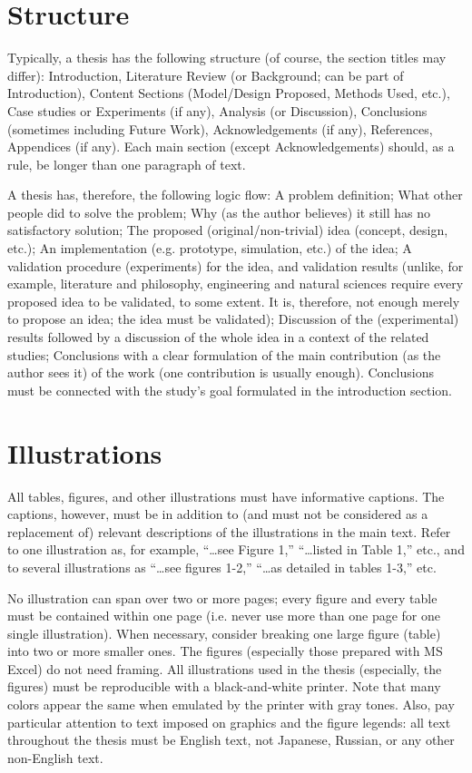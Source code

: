 \documentclass[12pt]{report}
\begin{document}
\section{Structure}
Typically, a thesis has the following structure (of course, the section titles may differ): Introduction, Literature Review (or Background; can be part of Introduction), Content Sections (Model/Design Proposed, Methods Used, etc.), Case studies or Experiments (if any), Analysis (or Discussion), Conclusions (sometimes including Future Work), Acknowledgements (if any), References, Appendices (if any). Each main section (except Acknowledgements) should, as a rule, be longer than one paragraph of text.

A thesis has, therefore, the following logic flow: A problem definition; What other people did to solve the problem; Why (as the author believes) it still has no satisfactory solution; The proposed (original/non-trivial) idea (concept, design, etc.); An implementation (e.g. prototype, simulation, etc.) of the idea; A validation procedure (experiments) for the idea, and validation results (unlike, for example, literature and philosophy, engineering and natural sciences require every proposed idea to be validated, to some extent. It is, therefore, not enough merely to propose an idea; the idea must be validated); Discussion of the (experimental) results followed by a discussion of the whole idea in a context of the related studies; Conclusions with a clear formulation of the main contribution (as the author sees it) of the work (one contribution is usually enough). Conclusions must be connected with the study’s goal formulated in the introduction section.

\section{Illustrations}
All tables, figures, and other illustrations must have informative captions. The captions, however, must be in addition to (and must not be considered as a replacement of) relevant descriptions of the illustrations in the main text. Refer to one illustration as, for example, “…see Figure 1,” “…listed in Table 1,” etc., and to several illustrations as “…see figures 1-2,” “…as detailed in tables 1-3,” etc.

No illustration can span over two or more pages; every figure and every table must be contained within one page (i.e. never use more than one page for one single illustration). When necessary, consider breaking one large figure (table) into two or more smaller ones. The figures (especially those prepared with MS Excel) do not need framing. All illustrations used in the thesis (especially, the figures) must be reproducible with a black-and-white printer. Note that many colors appear the same when emulated by the printer with gray tones. Also, pay particular attention to text imposed on graphics and the figure legends: all text throughout the thesis must be English text, not Japanese, Russian, or any other non-English text.
\end{document}
